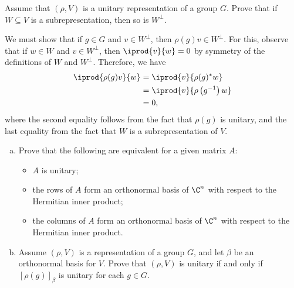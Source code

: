 \documentclass[10pt]{mypackage}
\begin{document}
\RaggedRight
\begin{problem}[Problem 1]
  Assume that $\left( \rho,V \right)$ is a unitary representation of a group $G$. Prove that if $W\subseteq V$ is a subrepresentation, then so is $W^{\perp}$.
\end{problem}
\begin{solution}
  We must show that if $g\in G$ and $v\in W^{\perp}$, then $\rho(g)v\in W^{\perp}$. For this, observe that if $w\in W$ and $v\in W^{\perp}$, then $ \iprod{v}{w} = 0 $ by symmetry of the definitions of $W$ and $W^{\perp}$. Therefore, we have
  \begin{align*}
    \iprod{\rho(g)v}{w} &= \iprod{v}{\rho(g)^{\ast}w}\\
                        &= \iprod{v}{\rho\left( g^{-1} \right)w}\\
                        &= 0,
  \end{align*}
  where the second equality follows from the fact that $\rho(g)$ is unitary, and the last equality from the fact that $W$ is a subrepresentation of $V$.
\end{solution}
\begin{problem}[Problem 2]\hfill
  \begin{enumerate}[(a)]
    \item Prove that the following are equivalent for a given matrix $A$: 
      \begin{itemize}
        \item $A$ is unitary;
        \item the rows of $A$ form an orthonormal basis of $\C^n$ with respect to the Hermitian inner product;
        \item the columns of $A$ form an orthonormal basis of $\C^n$ with respect to the Hermitian inner product.
      \end{itemize}
    \item Assume $\left( \rho,V \right)$ is a representation of a group $G$, and let $\beta$ be an orthonormal basis for $V$. Prove that $\left( \rho,V \right)$ is unitary if and only if $\left[ \rho(g) \right]_{\beta}$ is unitary for each $g\in G$.
  \end{enumerate}
\end{problem}
\end{document}
